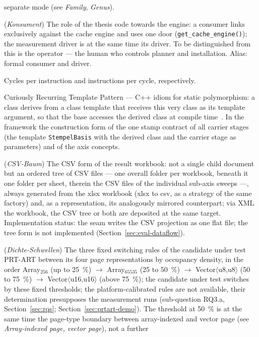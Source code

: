 \begin{description}
  separate mode (see \emph{Family}, \emph{Genus}).
  \item[Consumer] (\emph{Konsument}) The role of the thesis code towards the engine: a consumer
  links exclusively against the cache engine and uses one door (\texttt{get\_cache\_engine()}); the
  measurement driver is at the same time its driver. To be distinguished from this is the operator
  --- the human who controls planner and installation. Alias: formal consumer and driver.
  \item[CPI, IPC] Cycles per instruction and instructions per cycle, respectively.
  \item[CRTP] Curiously Recurring Template Pattern --- C++ idiom for static polymorphism: a class
  derives from a class template that receives this very class as its template argument, so that the
  base accesses the derived class at compile time~\cite{coplien1995crtp}. In the framework the
  construction form of the one stamp contract of all carrier stages (the template
  \texttt{StempelBasis} with the derived class and the carrier stage as parameters) and of the axis
  concepts.
  \item[CSV tree] (\emph{CSV-Baum}) The CSV form of the result workbook: not a single child
  document but an ordered tree of CSV files --- one overall folder per workbook, beneath it one
  folder per sheet, therein the CSV files of the individual sub-axis sweeps ---, always generated
  from the xlsx workbook (xlsx to csv, as a strategy of the same factory) and, as a representation,
  its analogously mirrored counterpart; via XML the workbook, the CSV tree or both are deposited at
  the same target. Implementation status: the seam writes the CSV projection as one flat file; the
  tree form is not implemented (Section~\ref{sec:eval-dataflow}).
  \item[Density thresholds] (\emph{Dichte-Schwellen}) The three fixed switching rules of the candidate under test
  PRT-ART between its four page representations by occupancy density, in the order
  Array$_{256}$ (up to 25~\%) $\to$ Array$_{65535}$ (25 to 50~\%) $\to$ Vector$\langle$u8,u8$\rangle$
  (50 to 75~\%) $\to$ Vector$\langle$u16,u16$\rangle$ (above 75~\%); the candidate under test switches by these
  fixed thresholds; the platform-calibrated rules are not available, their determination
  presupposes the measurement runs (sub-question RQ3.a, Section~\ref{sec:rqs};
  Section~\ref{sec:prtart-demo}). The threshold at 50~\% is at the same time the page-type boundary
  between array-indexed and vector page (see \emph{Array-indexed page, vector page}), not a further

\end{description}

